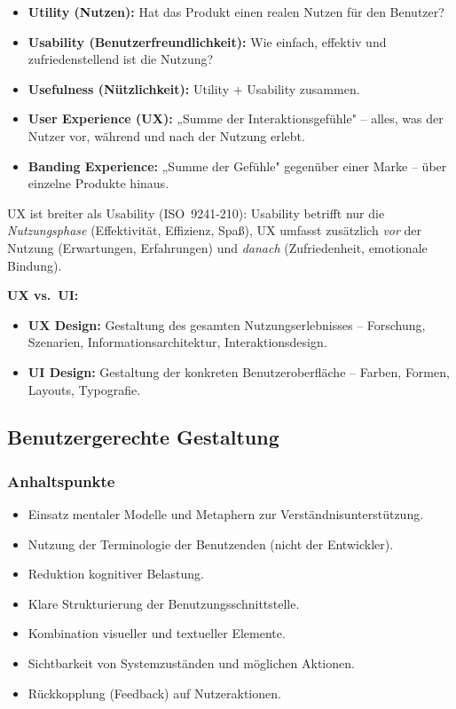 \documentclass[12pt, a4paper]{article}
\begin{document}
\begin{itemize}
  \item \textbf{Utility (Nutzen):} Hat das Produkt einen realen Nutzen für den Benutzer?
  \item \textbf{Usability (Benutzerfreundlichkeit):} Wie einfach, effektiv und zufriedenstellend ist die Nutzung?
  \item \textbf{Usefulness (Nützlichkeit):} Utility + Usability zusammen.
  \item \textbf{User Experience (UX):} „Summe der Interaktionsgefühle" -- alles, was der Nutzer vor, während und nach der Nutzung erlebt.
  \item \textbf{Banding Experience:} „Summe der Gefühle" gegenüber einer Marke -- über einzelne Produkte hinaus.
\end{itemize}

UX ist breiter als Usability (ISO~9241-210): Usability betrifft nur die \textit{Nutzungsphase} (Effektivität, Effizienz, Spaß), UX umfasst zusätzlich \textit{vor} der Nutzung (Erwartungen, Erfahrungen) und \textit{danach} (Zufriedenheit, emotionale Bindung).

\textbf{UX vs.\ UI:}
\begin{itemize}
  \item \textbf{UX Design:} Gestaltung des gesamten Nutzungserlebnisses -- Forschung, Szenarien, Informationsarchitektur, Interaktionsdesign.
  \item \textbf{UI Design:} Gestaltung der konkreten Benutzeroberfläche -- Farben, Formen, Layouts, Typografie.
\end{itemize}

\subsection{Benutzergerechte Gestaltung}

\subsubsection*{Anhaltspunkte}
\begin{itemize}
  \item Einsatz mentaler Modelle und Metaphern zur Verständnisunterstützung.
  \item Nutzung der Terminologie der Benutzenden (nicht der Entwickler).
  \item Reduktion kognitiver Belastung.
  \item Klare Strukturierung der Benutzungsschnittstelle.
  \item Kombination visueller und textueller Elemente.
  \item Sichtbarkeit von Systemzuständen und möglichen Aktionen.
  \item Rückkopplung (Feedback) auf Nutzeraktionen.
\end{itemize}
\end{document}
